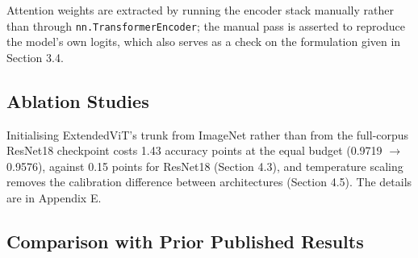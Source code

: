 Attention weights are extracted by running the encoder stack manually
rather than through \texttt{nn.TransformerEncoder}; the manual pass is
asserted to reproduce the model's own logits, which also serves as a
check on the formulation given in Section 3.4.

\hypertarget{ablation-studies}{%
\subsection{Ablation Studies}\label{ablation-studies}}

Initialising ExtendedViT's trunk from ImageNet rather than from the full-corpus ResNet18 checkpoint costs 1.43 accuracy points at the equal budget (0.9719 \ensuremath{\rightarrow} 0.9576), against 0.15 points for ResNet18 (Section 4.3), and temperature scaling removes the calibration difference between architectures (Section 4.5). The details are in Appendix E.

\hypertarget{comparison-with-prior-published-results}{%
\subsection{Comparison with Prior Published
Results}\label{comparison-with-prior-published-results}}

